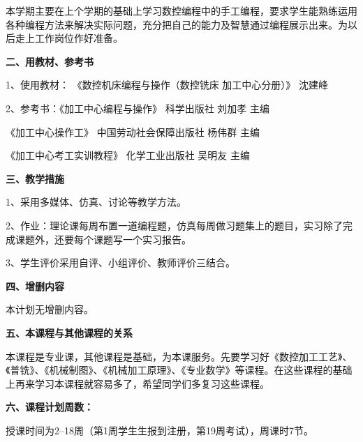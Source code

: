 \documentclass[12pt]{article}
\begin{document}
本学期主要在上个学期的基础上学习数控编程中的手工编程，要求学生能熟练运用各种编程方法来解决实际问题，充分把自己的能力及智慧通过编程展示出来。为以后走上工作岗位作好准备。

\textbf{二、用教材、参考书}

1、使用教材： 《数控机床编程与操作（数控铣床 加工中心分册）》 沈建峰

2、参考书：《加工中心编程与操作》  科学出版社  刘加孝   主编

\hspace{4.5em}《加工中心操作工》 中国劳动社会保障出版社  杨伟群  主编

\hspace{4.5em}《加工中心考工实训教程》  化学工业出版社   吴明友 主编

\textbf{三、教学措施}

1、采用多媒体、仿真、讨论等教学方法。

2、作业：理论课每周布置一道编程题，仿真每周做习题集上的题目，实习除了完成课题外，还要每个课题写一个实习报告。

3、学生评价采用自评、小组评价、教师评价三结合。

\textbf{四、增删内容}

本计划无增删内容。

\textbf{五、本课程与其他课程的关系}

本课程是专业课，其他课程是基础，为本课服务。先要学习好《数控加工工艺》、《普铣》、《机械制图》、《机械加工原理》、《专业数学》等课程。在这些课程的基础上再来学习本课程就容易多了，希望同学们多复习这些课程。

\textbf{六、课程计划周数：}

授课时间为2--18周（第1周学生生报到注册，第19周考试），周课时7节。
\end{document}
